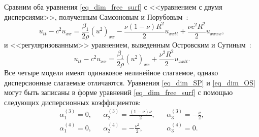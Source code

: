 \documentclass[12pt, a4paper]{report}
\begin{document}
Сравним оба уравнения \eqref{eq_dim_free_surf} с <<уравнением с двумя дисперсиями>>, полученным Самсоновым и Порубовым~\cite{SP}:
\begin{equation}\label{eq_dim_SP}
u_{tt} - c^2 u_{xx} =  \frac{\beta_1}{2 \rho} (u^2)_{xx} - \frac{\nu (1-\nu) R^2}{2} u_{xxtt} + \frac{\nu c^2 R^2}{2} u_{xxxx},
\end{equation}
и <<регуляризованным>> уравнением, выведенным Островским и Сутиным~\cite{OS}:
\begin{equation}\label{eq_dim_OS}
u_{tt} - c^2 u_{xx} =  \frac{\beta_1}{2 \rho} (u^2)_{xx} + \frac{\nu^2 R^2}{2} u_{xxtt}.
\end{equation}
Все четыре модели имеют одинаковое нелинейное слагаемое, однако дисперсионные слагаемые отличаются. Уравнения \eqref{eq_dim_SP} и \eqref{eq_dim_OS} могут быть записаны в форме уравнений \eqref{eq_dim_free_surf} с помощью следующих дисперсионных коэффициентов:
\begin{align} \nonumber
&\alpha_1^{(3)} = 0,& &\alpha_2^{(3)} = \frac{(1-\nu)\nu}{2},&  &\alpha_3^{(3)} = -\frac \nu 2,&\\
\nonumber
&\alpha_1^{(4)} = 0,& &\alpha_2^{(4)} = -\frac{\nu^2}{2},&  &\alpha_3^{(4)} = 0.&
\end{align}
\end{document}

